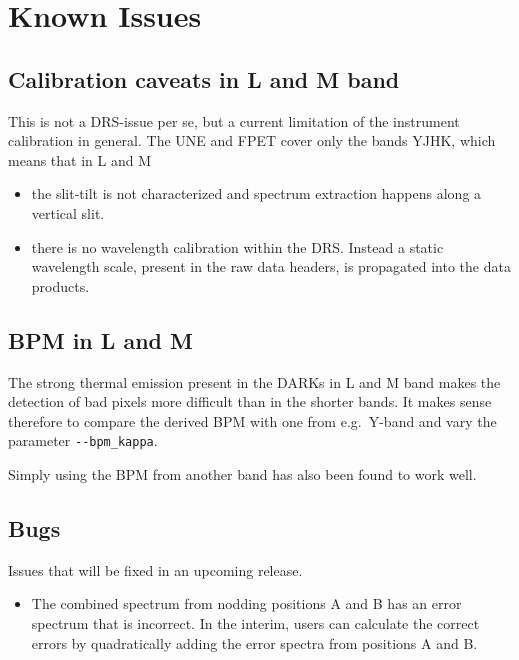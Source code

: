 \section{Known Issues}
\label{sec:knownissues}


\subsection{Calibration caveats in L and M band}

This is not a DRS-issue per se, but a current limitation of the instrument calibration in general. The UNE and FPET cover only the bands YJHK, which means that in L and M
\begin{itemize}
    \item the slit-tilt is not characterized and spectrum extraction happens along a vertical slit.
    \item there is no wavelength calibration within the DRS. Instead a static wavelength scale, present in the raw data headers, is propagated into the data products.
\end{itemize}


\subsection{BPM in L and M}

The strong thermal emission present in the DARKs in L and M band makes the detection of bad pixels more difficult than in the shorter bands. It makes sense therefore to compare the derived BPM with one from e.g.~Y-band and vary the parameter \verb!--bpm_kappa!.

Simply using the BPM from another band has also been found to work well.

\subsection{Bugs}
Issues that will be fixed in an upcoming release.

\begin{itemize}
    \item The combined spectrum from nodding positions A and B has an error
    spectrum that is incorrect. In the interim, users can calculate  the correct
    errors by quadratically adding the error spectra from positions A and B.
\end{itemize}